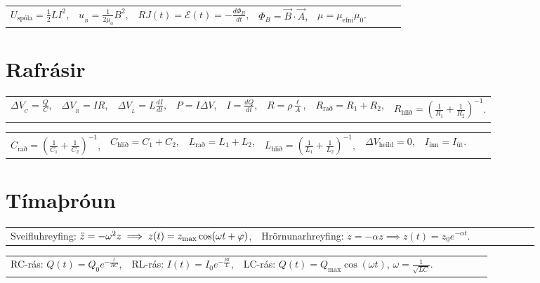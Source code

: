 \begin{table}[H]
\begin{tabular}{llllllll}
$U_{\text{spóla}} = \frac{1}{2}LI^2$, & $\displaystyle u_{\!_B} = \frac{1}{2\mu_0}B^2$, & $\displaystyle RJ(t) = \mathcal{E}(t) = -\frac{d\Phi_B}{dt}$, & $\Phi_B = \vec{B} \cdot \vec{A}$, & $\mu = \mu_{\text{efni}} \mu_0$.
\end{tabular}
\end{table}

\section*{Rafrásir}

\begin{table}[H]
\begin{tabular}{llllllll}
$\Delta V_{\!_C} = \frac{Q}{C}$, & $\Delta V_{\!_R} = IR$, & $\Delta V_{\!_L} = L \frac{dI}{dt}$, & $P = I\Delta V$, & $I = \frac{dQ}{dt}$, & $R = \rho \frac{\ell}{A}$, & $R_{\text{rað}} = R_1 + R_2$, & $R_{\text{hlið}} = \left( \frac{1}{R_1} + \frac{1}{R_2} \right)^{-1}$.
\end{tabular}
\end{table}

\begin{table}[H]
\begin{tabular}{llllllll}
$C_{\text{rað}} = \left( \frac{1}{C_1} + \frac{1}{C_2} \right)^{-1}$, & $C_{\text{hlið}} = C_1 + C_2$, & $L_{\text{rað}} = L_1 + L_2$, & $L_{\text{hlið}} = \left( \frac{1}{L_1} + \frac{1}{L_2} \right)^{-1}$,  & $\Delta V_{\text{heild}} = 0$, & $I_{\text{inn}} = I_{\text{út}}$.
\end{tabular}
\end{table}

\section*{Tímaþróun}

\begin{table}[H]
\begin{tabular}{llllllll}
Sveifluhreyfing: $\Ddot{z} = -\omega^2 z \implies z(t) = z_{\text{max}} \cos(\omega t + \varphi)$, & Hrörnunarhreyfing: $\dot{z} = -\alpha z \implies z(t) = z_0 e^{-\alpha t}$.
\end{tabular}
\end{table}

\begin{table}[H]
\begin{tabular}{llllllll}
RC-rás: $Q(t) = Q_0e^{-\frac{t}{RC}}$, & RL-rás: $I(t) = I_0e^{-\frac{Rt}{L}}$, & LC-rás: $Q(t) = Q_{\text{max}}\cos( \omega t)$, $\omega = \frac{1}{\sqrt{LC}}$.
\end{tabular}
\end{table}

